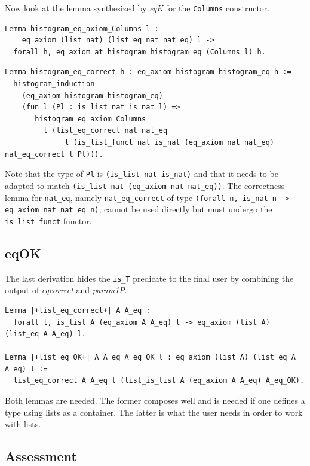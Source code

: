 \documentclass[a4paper,UKenglish,cleveref, autoref]{lipics-v2019}
\newcommand{\derive}[1]{\emph{#1}}
\begin{document}
Now look at the lemma synthesized by \derive{eqK}
for the \lstinline+Columns+ constructor.

\begin{lstlisting}
Lemma histogram_eq_axiom_Columns l :
    eq_axiom (list nat) (list_eq nat nat_eq) l ->
  forall h, eq_axiom_at histogram histogram_eq (Columns l) h.
\end{lstlisting}

\begin{lstlisting}
Lemma histogram_eq_correct h : eq_axiom histogram histogram_eq h :=
  histogram_induction 
    (eq_axiom histogram histogram_eq)
    (fun l (Pl : is_list nat is_nat l) =>
       histogram_eq_axiom_Columns
         l (list_eq_correct nat nat_eq
              l (is_list_funct nat is_nat (eq_axiom nat nat_eq) nat_eq_correct l Pl))).
\end{lstlisting}

\noindent
Note that the type of \lstinline+Pl+ is
\lstinline+(is_list nat is_nat)+ and that it
needs to be adapted to match
\lstinline+(is_list nat (eq_axiom nat nat_eq))+.
The correctness lemma for \lstinline+nat_eq+, namely \lstinline+nat_eq_correct+ of type
\lstinline+(forall n, is_nat n -> eq_axiom nat nat_eq n)+, cannot be used directly
but must undergo the \lstinline+is_list_funct+ functor.

\subsection{eqOK} %

The last derivation hides the \lstinline+is_T+ predicate
to the final user by combining the output of
\derive{eqcorrect} and \derive{param1P}.

\begin{lstlisting}
Lemma |+list_eq_correct+| A A_eq :
  forall l, is_list A (eq_axiom A A_eq) l -> eq_axiom (list A) (list_eq A A_eq) l.

Lemma |+list_eq_OK+| A A_eq A_eq_OK l : eq_axiom (list A) (list_eq A A_eq) l :=
  list_eq_correct A A_eq l (list_is_list A (eq_axiom A A_eq) A_eq_OK).
\end{lstlisting}

\noindent
Both lemmas are needed. The former composes well
and is needed if one defines a type using lists as a container.
The latter is what the user needs in order to work with lists.

\subsection{Assessment} %
\end{document}
